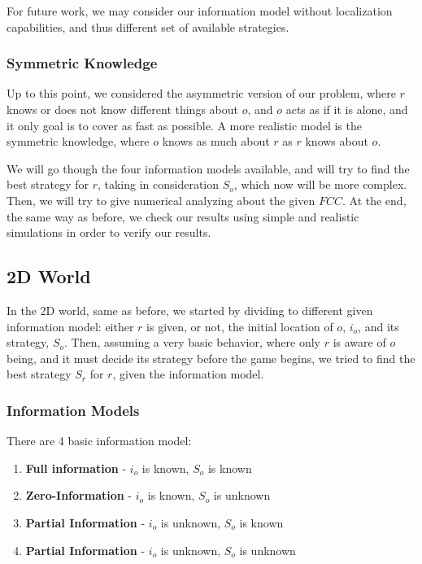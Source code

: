 \documentclass[a4paper,english,10pt]{article}
\newcommand\rob{\ensuremath{r}\xspace}
\newcommand\opp{\ensuremath{o}\xspace}
\newcommand{\fcc}{\ensuremath{FCC}\xspace}
\begin{document}
For future work, we may consider our information model without localization capabilities, and thus different set of available strategies.

\subsubsection{Symmetric Knowledge}
Up to this point, we considered the asymmetric version of our problem, where \rob knows or does not know different things about \opp, and \opp acts as if it is alone, and it only goal is to cover as fast as possible.
A more realistic model is the symmetric knowledge, where \opp knows as much about \rob as \rob knows about \opp.

We will go though the four information models available, and will try to find the best strategy for \rob, taking in consideration $S_\opp$, which now will be more complex. Then, we will try to give numerical analyzing about the given \fcc. At the end, the same way as before, we check our results using simple and realistic simulations in order to verify our results.

\subsection{2D World}
In the 2D world, same as before, we started by dividing to different given information model: either \rob is given, or not, the initial location of \opp, $i_\opp$, and its strategy, $S_\opp$. Then, assuming a very basic behavior, where only \rob is aware of \opp being, and it must decide its strategy before the game begins, we tried to find the best strategy $S_\rob$ for \rob, given the information model.

\subsubsection{Information Models}
There are 4 basic information model: 
\begin{enumerate}
\item \textbf{Full information} - $i_\opp$ is known, $S_\opp$ is known
\item \textbf{Zero-Information} - $i_\opp$ is known, $S_\opp$ is unknown
\item \textbf{Partial Information} -  $i_\opp$ is unknown, $S_\opp$ is known
\item \textbf{Partial Information} - $i_\opp$ is unknown, $S_\opp$ is unknown
\end{enumerate}
\end{document}
